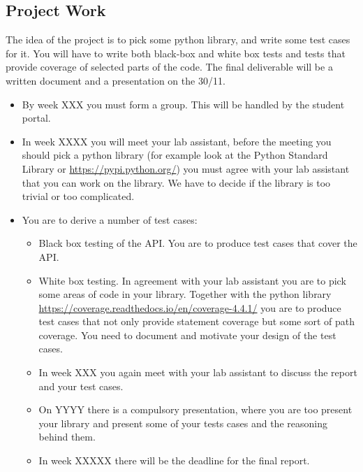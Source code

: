 \documentclass[a4page]{article}
\begin{document}
\subsection{Project Work}

The idea of the project is to pick some python library, and write some
test cases for it. You will have to write both black-box and white box
tests and tests that provide coverage of selected parts of the
code. The final deliverable will be a written document and a
presentation on the 30/11. 
  \begin{itemize}
  \item By  week  XXX you must form a group. This will be
    handled by the student portal.
  \item In week XXXX you will meet your lab assistant, before the
    meeting you should pick a python library (for example look at the Python
    Standard Library or \url{https://pypi.python.org/}) you must agree
    with your lab assistant that you can work on the library. We have
    to decide if the library is too trivial or too complicated.
  \item You are to derive a number of test cases:
    \begin{itemize}
    \item  Black box testing of the API. You are to produce test cases
      that cover the API.
    \item  White box testing. In agreement with your lab assistant you
      are to pick some areas of code in your library. Together with
      the python library
      \url{https://coverage.readthedocs.io/en/coverage-4.4.1/} you are
      to produce test cases that not only provide statement coverage
      but some sort of path coverage. You need to document and
      motivate your design of the test cases.
    \item In week XXX you again meet with your lab assistant to
      discuss the report and your test cases.
    \item On YYYY there is a compulsory presentation, where you are
      too present your library and present some of your tests cases
      and the reasoning behind them.
    \item In week XXXXX there will be the deadline for the final
      report. 
    \end{itemize}
  \end{itemize}
\end{document}
